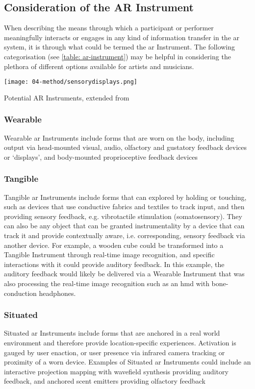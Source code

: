 \subsection{Consideration of the AR Instrument}\label{sec: discussion-guidelines-instrument}
When describing the means through which a participant or performer meaningfully interacts or engages in any kind of information transfer in the \gls{ar} system, it is through what could be termed the \gls{ar} Instrument. The following categorisation (see \autoref{table: ar-instrument}) may be helpful in considering the plethora of different options available for artists and musicians.

\begin{table}
    \centering
    {\texttt{[image: 04-method/sensorydisplays.png]}}
    \caption[Potential AR Instruments, extended from \citep{lindeman2007}]{Potential AR Instruments, extended from \citep{lindeman2007}}
\end{table}\label{table: ar-instrument}

\subsubsection{Wearable}
Wearable \gls{ar} Instruments include forms that are worn on the body, including output via head-mounted visual, audio, olfactory and gustatory feedback devices or `displays', and body-mounted proprioceptive feedback devices

\subsubsection{Tangible}
Tangible \gls{ar} Instruments include forms that can explored by holding or touching, such as devices that use conductive fabrics and textiles to track input, and then providing sensory feedback, e.g. vibrotactile stimulation (somatosensory). They can also be any object that can be granted instrumentality by a device that can track it and provide contextually aware, i.e. corresponding, sensory feedback via another device. For example, a wooden cube could be transformed into a Tangible Instrument through real-time image recognition, and specific interactions with it could provide auditory feedback. In this example, the auditory feedback would likely be delivered via a Wearable Instrument that was also processing the real-time image recognition such as an \gls{hmd} with bone-conduction headphones.

\subsubsection{Situated}
Situated \gls{ar} Instruments include forms that are anchored in a real world environment and therefore provide location-specific experiences. Activation is gauged by user enaction, or user presence via infrared camera tracking or proximity of a worn device. Examples of Situated \gls{ar} Instruments could include an interactive projection mapping with wavefield synthesis providing auditory feedback, and anchored scent emitters providing olfactory feedback

